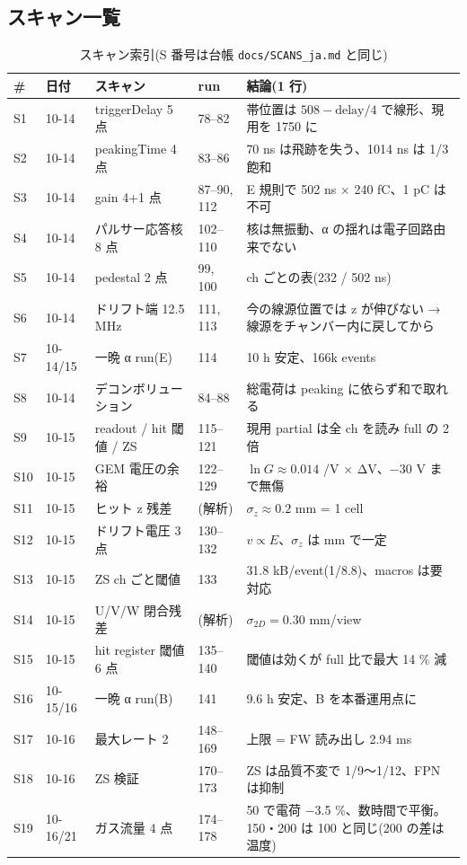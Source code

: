 \documentclass[a4paper,11pt]{ltjsarticle}
\begin{document}
\subsection{スキャン一覧}
\begin{table}[H]\centering\small
\caption{スキャン索引(S 番号は台帳 \texttt{docs/SCANS\_ja.md} と同じ)}
\begin{tabular}{llllp{68mm}}
\toprule
\# & 日付 & スキャン & run & 結論(1 行) \\
\midrule
S1 & 10-14 & triggerDelay 5 点 & 78--82 & 帯位置は $508 - \mathrm{delay}/4$ で線形、現用を 1750 に \\
S2 & 10-14 & peakingTime 4 点 & 83--86 & 70 ns は飛跡を失う、1014 ns は 1/3 飽和 \\
S3 & 10-14 & gain 4+1 点 & 87--90, 112 & E 規則で 502 ns × 240 fC、1 pC は不可 \\
S4 & 10-14 & パルサー応答核 8 点 & 102--110 & 核は無振動、α の揺れは電子回路由来でない \\
S5 & 10-14 & pedestal 2 点 & 99, 100 & ch ごとの表(232 / 502 ns) \\
S6 & 10-14 & ドリフト端 12.5 MHz & 111, 113 & 今の線源位置では z が伸びない → 線源をチャンバー内に戻してから \\
S7 & 10-14/15 & 一晩 α run(E) & 114 & 10 h 安定、166k events \\
S8 & 10-14 & デコンボリューション & 84--88 & 総電荷は peaking に依らず和で取れる \\
S9 & 10-15 & readout / hit 閾値 / ZS & 115--121 & 現用 partial は全 ch を読み full の 2 倍 \\
S10 & 10-15 & GEM 電圧の余裕 & 122--129 & $\ln G \approx 0.014$ /V × ΔV、$-30$ V まで無傷 \\
S11 & 10-15 & ヒット z 残差 & (解析) & $\sigma_z \approx 0.2$ mm = 1 cell \\
S12 & 10-15 & ドリフト電圧 3 点 & 130--132 & $v \propto E$、$\sigma_z$ は mm で一定 \\
S13 & 10-15 & ZS ch ごと閾値 & 133 & 31.8 kB/event(1/8.8)、macros は要対応 \\
S14 & 10-15 & U/V/W 閉合残差 & (解析) & $\sigma_{2D} = 0.30$ mm/view \\
S15 & 10-15 & hit register 閾値 6 点 & 135--140 & 閾値は効くが full 比で最大 14 \% 減 \\
S16 & 10-15/16 & 一晩 α run(B) & 141 & 9.6 h 安定、B を本番運用点に \\
S17 & 10-16 & 最大レート 2 & 148--169 & 上限 = FW 読み出し 2.94 ms \\
S18 & 10-16 & ZS 検証 & 170--173 & ZS は品質不変で 1/9〜1/12、FPN は抑制 \\
S19 & 10-16/21 & ガス流量 4 点 & 174--178 & 50 で電荷 −3.5 \%、数時間で平衡。150・200 は 100 と同じ(200 の差は温度) \\
\bottomrule
\end{tabular}
\end{table}
\end{document}
